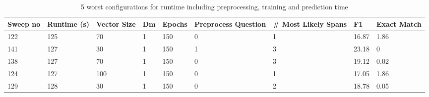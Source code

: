 \documentclass[11pt]{article}
\begin{document}
    \begin{table}[p]
        \centering
        \begin{tabularx}{\textwidth}{|X|X|X|X|X|X|X|X|X|}
            \hline
            Sweep no & Runtime (s) & Vector Size & Dm & Epochs & Preprocess Question & \# Most Likely Spans & F1 & Exact Match \\ \hline
            122      & 125         & 70          & 1  & 150    & 0                   & 1                    & 16.87 & 1.86        \\ \hline
            141      & 127         & 30          & 1  & 150    & 1                   & 3                    & 23.18 & 0           \\ \hline
            138      & 127         & 70          & 1  & 150    & 0                   & 3                    & 19.12 & 0.02        \\ \hline
            124      & 127         & 100         & 1  & 150    & 0                   & 1                    & 17.05 & 1.86        \\ \hline
            129      & 128         & 30          & 1  & 150    & 0                   & 2                    & 18.78 & 0.05        \\ \hline
        \end{tabularx}
        \caption{5 worst configurations for runtime including preprocessing, training and prediction time}
        \label{table:5-worst-runtime}
    \end{table}
\end{document}
